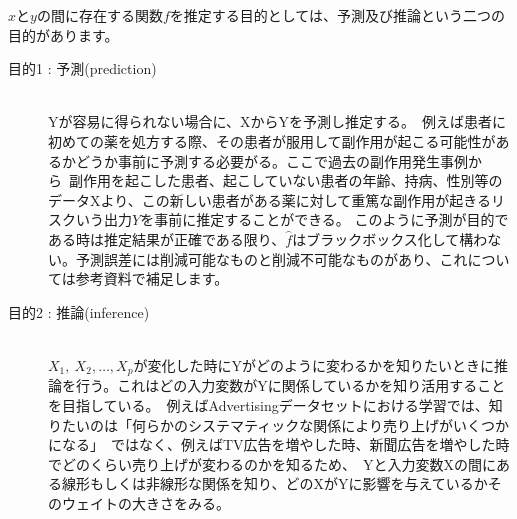 \documentclass[uplatex]{jsarticle}
\begin{document}
$xとyの間に存在する関数f$を推定する目的としては、予測及び推論という二つの目的があります。
\begin{description}
  \item[目的1 : 予測(prediction)]\mbox{}\\
  Yが容易に得られない場合に、XからYを予測し推定する。\
  例えば患者に初めての薬を処方する際、その患者が服用して副作用が起こる可能性があるかどうか事前に予測する必要がる。ここで過去の副作用発生事例から\
  副作用を起こした患者、起こしていない患者の年齢、持病、性別等のデータXより、この新しい患者がある薬に対して重篤な副作用が起きるリスクいう出力$Y$を事前に推定することができる。
  このように予測が目的である時は推定結果が正確である限り、$\hat{f}$はブラックボックス化して構わない。予測誤差には削減可能なものと削減不可能なものがあり、これについては参考資料で補足します。
  \item[目的2 : 推論(inference)]\mbox{}\\
  $X_1,\ X_2,\dots,X_p$が変化した時にYがどのように変わるかを知りたいときに推論を行う。これはどの入力変数がYに関係しているかを知り活用することを目指している。\
  例えばAdvertisingデータセットにおける学習では、知りたいのは「何らかのシステマティックな関係により売り上げがいくつかになる」\
  ではなく、例えばTV広告を増やした時、新聞広告を増やした時でどのくらい売り上げが変わるのかを知るため、\
  Yと入力変数Xの間にある線形もしくは非線形な関係を知り、どのXがYに影響を与えているかそのウェイトの大きさをみる。
\end{description}
\end{document}
